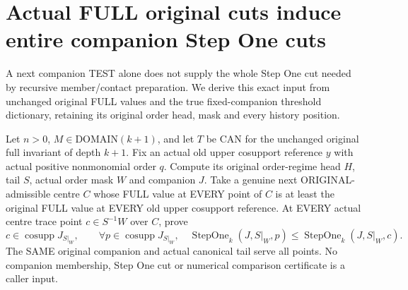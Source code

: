 \section{Actual FULL original cuts induce entire companion Step One cuts}

A next companion TEST alone does not supply the whole Step One cut needed
by recursive member/contact preparation. We derive this exact input from
unchanged original FULL values and the true fixed-companion threshold
dictionary, retaining its original order head, mask and every history position.

\begin{theorem}
\label{hir:original-full-cut-inherited-companion-stepone-cut}
\leanok
Let $n>0$, $M\in\mathrm{DOMAIN}(k+1)$, and let $T$ be CAN for the unchanged
original full invariant of depth $k+1$. Fix an actual old upper cosupport
reference $y$ with actual positive nonmonomial order $q$. Compute its original
order-regime head $H$, tail $S$, actual order mask $W$ and companion $J$.
Take a genuine next ORIGINAL-admissible centre $C$ whose FULL value at EVERY
point of $C$ is at least the original FULL value at EVERY old upper cosupport
reference. At EVERY actual centre trace point $c\in S^{-1}W$ over $C$, prove
\[
 c\in\operatorname{cosupp}J_{S|_W},\qquad
 \forall p\in\operatorname{cosupp}J_{S|_W},\quad
 \operatorname{StepOne}_{k}(J,S|_W,p)
 \le\operatorname{StepOne}_{k}(J,S|_W,c).
\]
The SAME original companion and actual canonical tail serve all points.
No companion membership, Step One cut or numerical comparison certificate
is a caller input.
\end{theorem}
